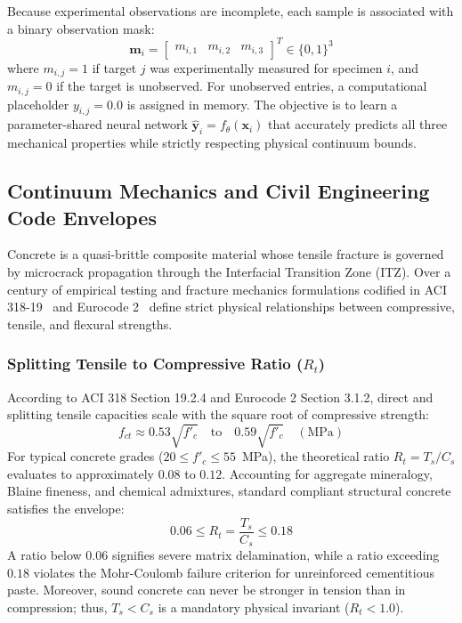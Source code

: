 \documentclass[conference]{IEEEtran}
\begin{document}
Because experimental observations are incomplete, each sample is associated with a binary observation mask:
\begin{equation}
    \mathbf{m}_i = \begin{bmatrix} m_{i,1} & m_{i,2} & m_{i,3} \end{bmatrix}^T \in \{0, 1\}^3
\end{equation}
where $m_{i,j} = 1$ if target $j$ was experimentally measured for specimen $i$, and $m_{i,j} = 0$ if the target is unobserved. For unobserved entries, a computational placeholder $y_{i,j} = 0.0$ is assigned in memory. The objective is to learn a parameter-shared neural network $\hat{\mathbf{y}}_i = f_\theta(\mathbf{x}_i)$ that accurately predicts all three mechanical properties while strictly respecting physical continuum bounds.

\subsection{Continuum Mechanics and Civil Engineering Code Envelopes}
Concrete is a quasi-brittle composite material whose tensile fracture is governed by microcrack propagation through the Interfacial Transition Zone (ITZ). Over a century of empirical testing and fracture mechanics formulations codified in ACI 318-19~\cite{aci318_19} and Eurocode 2~\cite{eurocode2} define strict physical relationships between compressive, tensile, and flexural strengths.

\subsubsection{Splitting Tensile to Compressive Ratio ($R_t$)}
According to ACI 318 Section 19.2.4 and Eurocode 2 Section 3.1.2, direct and splitting tensile capacities scale with the square root of compressive strength:
\begin{equation}
    f_{ct} \approx 0.53 \sqrt{f'_c} \quad \text{to} \quad 0.59 \sqrt{f'_c} \quad (\text{MPa})
\end{equation}
For typical concrete grades ($20 \le f'_c \le 55$~MPa), the theoretical ratio $R_t = T_s / C_s$ evaluates to approximately $0.08$ to $0.12$. Accounting for aggregate mineralogy, Blaine fineness, and chemical admixtures, standard compliant structural concrete satisfies the envelope:
\begin{equation}
    0.06 \le R_t = \frac{T_s}{C_s} \le 0.18
\end{equation}
A ratio below $0.06$ signifies severe matrix delamination, while a ratio exceeding $0.18$ violates the Mohr-Coulomb failure criterion for unreinforced cementitious paste. Moreover, sound concrete can never be stronger in tension than in compression; thus, $T_s < C_s$ is a mandatory physical invariant ($R_t < 1.0$).
\end{document}
